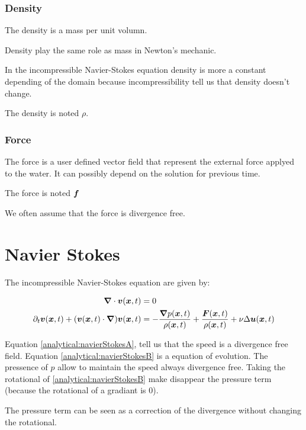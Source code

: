 \subsubsection{Density}

The density is a mass per unit volumn.

Density play the same role as mass in Newton's mechanic.

In the incompressible Navier-Stokes equation density is more a constant depending
of the domain because incompressibility tell us that density doesn't change.

The density is noted $\rho$.

\subsubsection{Force}

The force is a user defined vector field that represent the external force applyed to the water.
It can possibly depend on the solution for previous time.

The force is noted ${\boldsymbol {f}}$

We often assume that the force is divergence free.
\section{Navier Stokes}

The incompressible Navier-Stokes equation are given by:

\begin{align}
\label{analytical:navierStokesA}
{\boldsymbol {\nabla}} \cdot {\boldsymbol {v}}({\boldsymbol {x}} ,t)&=0\\
\label{analytical:navierStokesB}
\partial_t {\boldsymbol {v}}({\boldsymbol {x}} ,t)+({\boldsymbol {v}}({\boldsymbol {x}},t)\cdot{\boldsymbol {\nabla}} ) {\boldsymbol {v}}({\boldsymbol {x}} ,t)&=-\frac{{\boldsymbol {\nabla}} p({\boldsymbol {x}},t)}{\rho({\boldsymbol {x}},t)}+\frac{{\boldsymbol {F}}({\boldsymbol {x}},t)}{\rho({\boldsymbol {x}},t)}+\nu \Delta {\boldsymbol {u}}({\boldsymbol {x}},t)
\end{align}

Equation \ref{analytical:navierStokesA}, tell us that the speed is a divergence free field.
Equation \ref{analytical:navierStokesB} is a equation of evolution. The pressence of $p$ allow to maintain the speed always divergence free.
Taking the rotational of \ref{analytical:navierStokesB} make disappear the pressure term (because the rotational of a gradiant is 0).

The pressure term can be seen as a correction of the divergence without changing the rotational.

